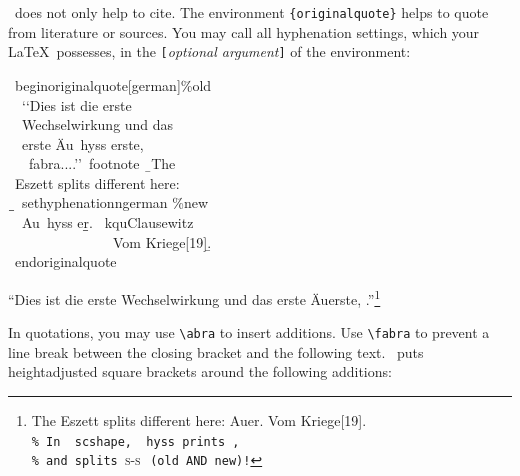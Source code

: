 \documentclass[12pt,a4paper]{article}
\newcommand{\pbs}{\string\ \unskip}
\newcommand{\bs}{\protect\pbs}
\renewcommand{\{}{{\normalfont\lbashortmem}}
\renewcommand{\}}{{\normalfont\rbashortmem}}
\begin{document}
\vspace{1.5ex}\noindent
\BibArts\ does not only help to cite. The environment \verb|{originalquote}|
helps to quote from literature or sources. You may call all hyphenation
settings, which your \LaTeX\ possesses, in the \verb|[|\textit{optional
argument}\verb|]| of the environment:

\vspace{-.5ex}
\Doppelbox
{\vspace{.5ex}
 \bs begin\{originalquote\}[german]\%old
 \\[.4ex] \ \ \string`\string`Dies ist die erste 
 \\ \ \ Wechselwirkung und das  
 \\ \ \ erste Äu\bs hyss erste, 
 \\ \ \ \bs fabra\{...\}.\string'\string'\bs footnote \ \b{\{}The 
 \\ \ Eszett splits different here:
 \\ \ \b{\b{\{}}\bs sethyphenation\{ngerman\} \%new
 \\[-.4ex] \ \ Au\bs hyss er\b{\b{\}}}. \bs kqu\{Clausewitz\} 
 \\[-.4ex] \ \ \ \ \ \ \ \ \ \ \ \ \ \ \ \{Vom Kriege\}[19].\b{\}}
 \\[.3ex] \bs end\{originalquote\}
 \vspace{.3ex}
}
{\renewcommand{\originalquotetype}{\footnotesize}%
 \begin{originalquote}[german]%
 ``Dies ist die erste
 Wechselwirkung und das
 erste Äu\hyss erste, 
 .''\footnote  {The 
  Eszett splits different here:
 { %
        Au\hyss er}. 
                {Vom Kriege}[19].
 \\[.5ex] \hspace*{3mm} \texttt{\% In \bs scshape, \bs hyss prints }{\scshape \hyss}\texttt{,}
 \\ \hspace*{3mm} \texttt{\% and splits }{\scshape s-s}\,\texttt{ (old AND new)!}%
 \vspace{-1.5ex}%
 }
 \end{originalquote}
}

\vspace{-.125ex}\noindent 
In quotations, you may use \verb|\abra| to insert additions. 
Use \verb|\fabra| to prevent a line break between the closing bracket and the following text. 
\BibArts\ puts height\hy adjusted square brackets around the following additions:
\end{document}
